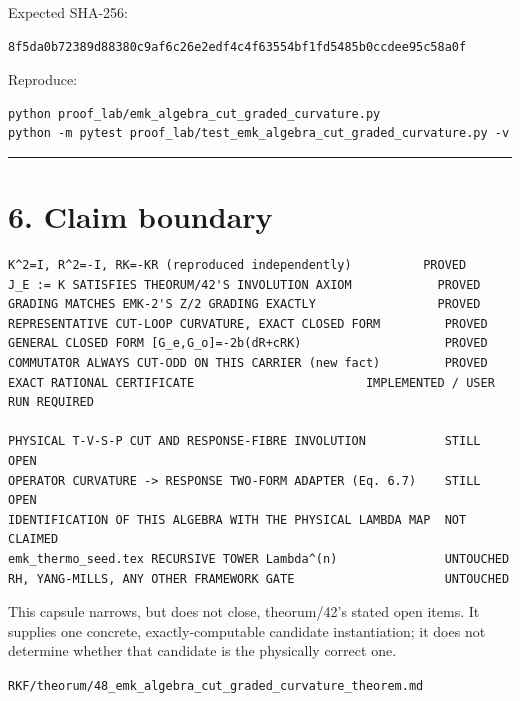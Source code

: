 Expected SHA-256:

\begin{verbatim}
8f5da0b72389d88380c9af6c26e2edf4c4f63554bf1fd5485b0ccdee95c58a0f
\end{verbatim}

Reproduce:

\begin{verbatim}
python proof_lab/emk_algebra_cut_graded_curvature.py
python -m pytest proof_lab/test_emk_algebra_cut_graded_curvature.py -v
\end{verbatim}

\begin{center}\rule{0.5\linewidth}{0.5pt}\end{center}

\hypertarget{claim-boundary}{%
\section{6. Claim boundary}\label{claim-boundary}}

\begin{verbatim}
K^2=I, R^2=-I, RK=-KR (reproduced independently)          PROVED
J_E := K SATISFIES THEORUM/42'S INVOLUTION AXIOM            PROVED
GRADING MATCHES EMK-2'S Z/2 GRADING EXACTLY                 PROVED
REPRESENTATIVE CUT-LOOP CURVATURE, EXACT CLOSED FORM         PROVED
GENERAL CLOSED FORM [G_e,G_o]=-2b(dR+cRK)                    PROVED
COMMUTATOR ALWAYS CUT-ODD ON THIS CARRIER (new fact)         PROVED
EXACT RATIONAL CERTIFICATE                        IMPLEMENTED / USER RUN REQUIRED

PHYSICAL T-V-S-P CUT AND RESPONSE-FIBRE INVOLUTION           STILL OPEN
OPERATOR CURVATURE -> RESPONSE TWO-FORM ADAPTER (Eq. 6.7)    STILL OPEN
IDENTIFICATION OF THIS ALGEBRA WITH THE PHYSICAL LAMBDA MAP  NOT CLAIMED
emk_thermo_seed.tex RECURSIVE TOWER Lambda^(n)               UNTOUCHED
RH, YANG-MILLS, ANY OTHER FRAMEWORK GATE                     UNTOUCHED
\end{verbatim}

This capsule narrows, but does not close, theorum/42's stated open items.
It supplies one concrete, exactly-computable candidate instantiation; it
does not determine whether that candidate is the physically correct one.

\begin{flushright}\small\texttt{RKF/theorum/48\_emk\_algebra\_cut\_graded\_curvature\_theorem.md}\end{flushright}
